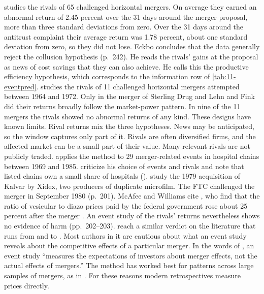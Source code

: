 \citet[p.~269]{Eckbo1983} studies the rivals of 65 challenged horizontal mergers. On average they earned an
abnormal return of 2.45 percent over the 31 days around the merger proposal, more than three standard deviations
from zero. Over the 31 days around the antitrust complaint their average return was 1.78 percent, about one standard
deviation from zero, so they did not lose. Eckbo concludes that the data generally reject the collusion hypothesis
(p.~242). He reads the rivals' gains at the proposal as news of cost savings that they can also achieve. He calls
this the productive efficiency hypothesis, which corresponds to the information row of \cref{tab:11-eventpred}.
\citet[p.~240]{Stillman1983} studies the rivals of 11
challenged horizontal mergers attempted between 1964 and 1972. Only in the merger of Sterling Drug and Lehn and Fink
did their returns broadly follow the market-power pattern. In nine of the 11 mergers the rivals showed no abnormal
returns of any kind.
These designs have known limits. Rival returns mix the three hypotheses. News may be anticipated, so the window
captures only part of it. Rivals are often diversified firms, and the affected market can be a small part of
their value. Many relevant rivals are not publicly traded. \citet{Woolley1989} applies the method to 29
merger-related events in hospital chains between 1969 and 1985. \citet{VitaSchumann1991} criticize his choice of
events and rivals and note that listed chains own a small share of hospitals (\citealp[p.~11]{Dafny2005}).
\citet{McAfeeWilliams1988} study the 1979 acquisition of Kalvar by Xidex, two producers of duplicate microfilm. The FTC
challenged the merger in September 1980 (p.~201). McAfee and Williams cite \citet{BartonSherman1984}, who find that
the ratio of vesicular to diazo prices paid by the federal government rose about 25 percent after the merger
\citep[p.~200]{McAfeeWilliams1988}.
An event study of the rivals' returns nevertheless shows no evidence of harm (pp.~202--203).
\citet[p.~231, n.~137]{AskerNocke2021} reach a similar verdict on the literature that runs from \citet{Eckbo1983}
and \citet{Stillman1983} to \citet{DusoNevenRoller2007}. Most authors in it are cautious about what an event study
reveals about the competitive effects of a particular merger. In the words of \citet{KaplowShapiro2007}, an event
study ``measures the expectations of investors about merger effects, not the actual effects of mergers.'' The method
has worked best for patterns across large samples of mergers, as in \citet{DusoNevenRoller2007}. For these reasons
modern retrospectives measure prices directly.

